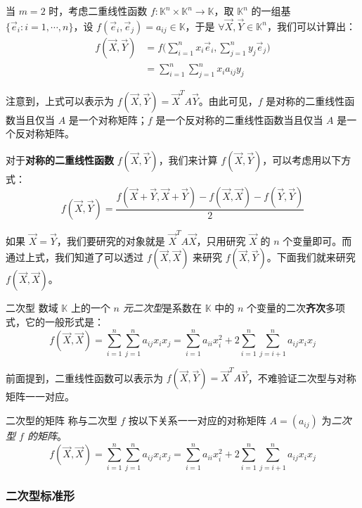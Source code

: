 \bigskip

当 $m = 2$ 时，考虑二重线性函数 $f \colon \mathbb K^n \times \mathbb K^n \to \mathbb K$，取 $\mathbb K^n$ 的一组基 $\{\vec e_i \colon i = 1, \cdots, n\}$，设 $f(\vec e_i, \vec e_j) = a_{ij} \in \mathbb K$，于是 $\forall \vec X, \vec Y \in \mathbb K^n$，我们可以计算出：
$$
\begin{aligned}
f(\vec X, \vec Y) &= f \biggl( \sum_{i = 1}^n x_i \vec e_i, \sum_{j = 1}^n y_j \vec e_j \biggr)
\\&=
\sum_{i = 1}^n \sum_{j = 1}^n x_i a_{ij} y_j
\end{aligned}
$$

注意到，上式可以表示为 $f(\vec X, \vec Y) = \vec X^T A \vec Y$。由此可见，$f$ 是对称的二重线性函数当且仅当 $A$ 是一个对称矩阵；$f$ 是一个反对称的二重线性函数当且仅当 $A$ 是一个反对称矩阵。

\bigskip

对于\textbf{对称的二重线性函数} $f(\vec X, \vec Y)$，我们来计算 $f(\vec X, \vec Y)$，可以考虑用以下方式：
$$
f(\vec X, \vec Y) = \frac{f(\vec X + \vec Y, \vec X + \vec Y) - f(\vec X, \vec X) - f(\vec Y, \vec Y)}{2}
$$

如果 $\vec X = \vec Y$，我们要研究的对象就是 $\vec X^T A \vec X$，只用研究 $\vec X$ 的 $n$ 个变量即可。而通过上式，我们知道了可以透过 $f(\vec X, \vec X)$ 来研究 $f(\vec X, \vec Y)$。下面我们就来研究 $f(\vec X, \vec X)$。

\begin{definition}{二次型}
	数域 $\mathbb K$ 上的一个 \emph{$n$ 元二次型}是系数在 $\mathbb K$ 中的 $n$ 个变量的二次\textbf{齐次}多项式，它的一般形式是：
	$$
	f(\vec X, \vec X) = \sum_{i = 1}^n \sum_{j = 1}^n a_{ij} x_i x_j = \sum_{i = 1}^n a_{ii} x_i^2 + 2 \sum_{i = 1}^n \sum_{j = i + 1}^n a_{ij} x_i x_j
	$$
\end{definition}

前面提到，二重线性函数可以表示为 $f(\vec X, \vec Y) = \vec X^T A \vec Y$，不难验证二次型与对称矩阵一一对应。

\begin{definition}{二次型的矩阵}
	称与二次型 $f$ 按以下关系一一对应的对称矩阵 $A = (a_{ij})$ 为\emph{二次型 $f$ 的矩阵}。
	$$
	f(\vec X, \vec X) = \sum_{i = 1}^n \sum_{j = 1}^n a_{ij} x_i x_j = \sum_{i = 1}^n a_{ii} x_i^2 + 2 \sum_{i = 1}^n \sum_{j = i + 1}^n a_{ij} x_i x_j
	$$
\end{definition}

\subsubsection{二次型标准形}

